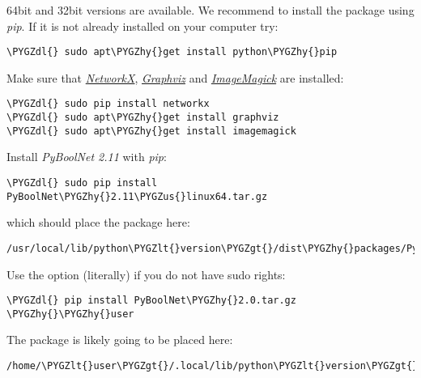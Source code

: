\documentclass[letterpaper,10pt,english]{sphinxmanual}
\def\PYGZus{\char`\_}
\def\PYGZlt{\char`\<}
\def\PYGZgt{\char`\>}
\def\PYGZdl{\char`\$}
\def\PYGZhy{\char`\-}
\begin{document}
64bit and 32bit versions are available. We recommend to install the package using \emph{pip}. If it is not already installed on your computer try:

\begin{Verbatim}[commandchars=\\\{\}]
\PYGZdl{} sudo apt\PYGZhy{}get install python\PYGZhy{}pip
\end{Verbatim}

Make sure that {\hyperref[Installation:installation-networkx]{\emph{NetworkX}}}, {\hyperref[Installation:installation-graphviz]{\emph{Graphviz}}} and {\hyperref[Installation:installation-imagemagick]{\emph{ImageMagick}}} are installed:

\begin{Verbatim}[commandchars=\\\{\}]
\PYGZdl{} sudo pip install networkx
\PYGZdl{} sudo apt\PYGZhy{}get install graphviz
\PYGZdl{} sudo apt\PYGZhy{}get install imagemagick
\end{Verbatim}

Install \emph{PyBoolNet 2.11} with \emph{pip}:

\begin{Verbatim}[commandchars=\\\{\}]
\PYGZdl{} sudo pip install PyBoolNet\PYGZhy{}2.11\PYGZus{}linux64.tar.gz
\end{Verbatim}

which should place the package here:

\begin{Verbatim}[commandchars=\\\{\}]
/usr/local/lib/python\PYGZlt{}version\PYGZgt{}/dist\PYGZhy{}packages/PyBoolNet
\end{Verbatim}

Use the option  (literally) if you do not have sudo rights:

\begin{Verbatim}[commandchars=\\\{\}]
\PYGZdl{} pip install PyBoolNet\PYGZhy{}2.0.tar.gz \PYGZhy{}\PYGZhy{}user
\end{Verbatim}

The package is likely going to be placed here:

\begin{Verbatim}[commandchars=\\\{\}]
/home/\PYGZlt{}user\PYGZgt{}/.local/lib/python\PYGZlt{}version\PYGZgt{}/dist\PYGZhy{}packages/PyBoolNet
\end{Verbatim}
\end{document}
